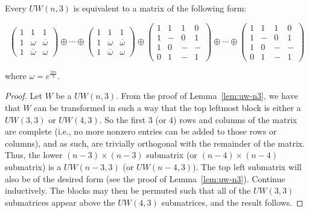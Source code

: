 \begin{theorem} \label{th:uw-n3-equiv}
 Every $UW(n,3)$ is equivalent to a matrix of the following form:

$$\left(
\begin{array}{ccc}
 1 & 1       &1 \\
 1 & \omega  &\overline{\omega} \\
 1 & \overline{\omega} &\omega       
\end{array}
\right) \oplus \cdots \oplus \left(
\begin{array}{ccc}
 1 & 1       &1 \\
 1 & \omega       &\overline{\omega} \\
 1 & \overline{\omega} &\omega       
\end{array}
\right) \oplus 
\left(
\begin{array}{cccc}
 1 & 1 &1 &0 \\
 1 & - &0 &1 \\
 1 & 0 &- &- \\
 0 & 1 &- &1
\end{array}
\right)
\oplus \cdots \oplus
\left(
\begin{array}{cccc}
 1 & 1 &1 &0 \\
 1 & - &0 &1 \\
 1 & 0 &- &- \\
 0 & 1 &- &1
\end{array}
\right)
$$

where $\omega=e^{\frac{2\pi i}{3}}$.

\begin{proof}
 Let $W$ be a $UW(n,3)$. From the proof of Lemma~\ref{lem:uw-n3}, we have that $W$ can be transformed in such a way that the top leftmost block is either a $UW(3,3)$ or $UW(4,3)$. So the first 3 (or 4) rows and columns of the matrix are complete (i.e., no more nonzero entries can be added to those rows or columns), and as such, are trivially orthogonal with the remainder of the matrix. Thus, the lower $(n-3)\times(n-3)$ submatrix (or $(n-4)\times(n-4)$ submatrix) is a $UW(n-3,3)$ (or $UW(n-4,3)$). The top left submatrix will also be of the desired form (see the proof of Lemma~\ref{lem:uw-n3}). Continue inductively. The blocks may then be permuted such that all of the $UW(3,3)$ submatrices appear above the $UW(4,3)$ submatrices, and the result follows.
\end{proof}

\end{theorem}


